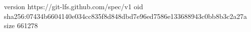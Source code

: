 version https://git-lfs.github.com/spec/v1
oid sha256:07434b6604140e034cc835f8d848dbd7e96ed7586e133688943c0bb8b3c2a27a
size 661278
